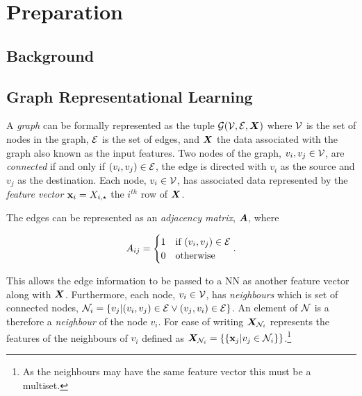 \chapter{Preparation}

\section{Background}

\section{Graph Representational Learning}



A \emph{graph} can be formally represented as the tuple ${\mathcal{G}}({\mathcal{V}}, {\mathcal{E}}, {\bm{X}})$ where ${\mathcal{V}}$ is the set of nodes in the graph, ${\mathcal{E}}$ is the set of edges, and ${\bm{X}}$ the data associated with the graph also known as the input features.
Two nodes of the graph, $v_i, v_j \in {\mathcal{V}}$, are \emph{connected} if and only if $(v_i, v_j) \in {\mathcal{E}}$, the edge is directed with $v_i$ as the source and $v_j$ as the destination.
Each node, $v_i \in {\mathcal{V}}$, has associated data represented by the \emph{feature vector} ${\textbf{x}}_i = {X}_{i,\star}$ the $i^{th}$ row of ${\bm{X}}$.

The edges can be represented as an \emph{adjacency matrix}, ${\bm{A}}$, where 

\begin{equation*}
{A}_{ij} = \begin{cases}1 &\text{if $(v_i, v_j) \in {\mathcal{E}}$} \\ 0 &\text{otherwise}\end{cases}.
\end{equation*}

This allows the edge information to be passed to a NN as another feature vector along with ${\bm{X}}$.
Furthermore, each node, $v_i \in {\mathcal{V}}$, has \emph{neighbours} which is set of connected nodes, ${\mathcal{N}}_i = \{v_j | (v_i, v_j) \in {\mathcal{E}} \vee (v_j, v_i) \in {\mathcal{E}}\}$.
An element of ${\mathcal{N}}$ is a therefore a \emph{neighbour} of the node $v_i$.
For ease of writing ${\bm{X}}_{{\mathcal{N}}_i}$ represents the features of the neighbours of $v_i$ defined as ${\bm{X}}_{{\mathcal{N}}_i} = \{\{{\textbf{x}}_j | v_j \in {\mathcal{N}}_i\}\}$.\footnote{As the neighbours may have the same feature vector this must be a multiset.}

